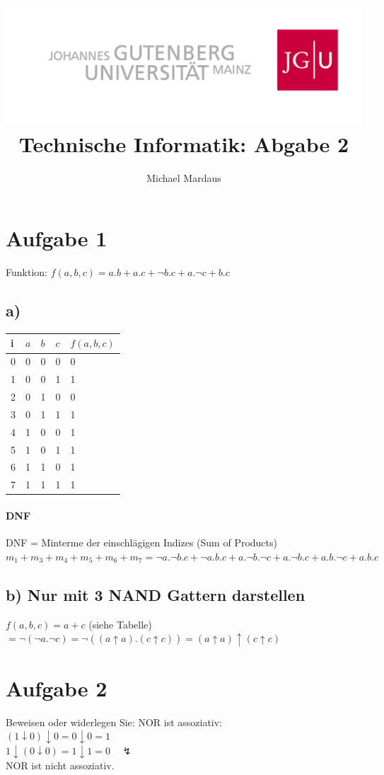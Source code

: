 \documentclass[10pt,a4paper]{scrartcl}
\author{Michael Mardaus}
\title{\includegraphics[scale=0.2]{../logo_schriftzug}\\ Technische Informatik:
Abgabe 2}
\begin{document}
\maketitle


\section{Aufgabe 1}
Funktion:
$f(a,b,c)=a.b + a.c + \neg b.c + a.\neg c + b.c$\\
\subsection{a)}
\begin{tabular}{|l||l|l|l||l|}\hline
i & $a$ & $b$ & $c$ & $f(a,b,c)$ \\\hline\hline
0 & 0 & 0 & 0 & 0 \\\hline
1 & 0 & 0 & 1 & 1 \\\hline
2 & 0 & 1 & 0 & 0 \\\hline
3 & 0 & 1 & 1 & 1 \\\hline
4 & 1 & 0 & 0 & 1 \\\hline
5 & 1 & 0 & 1 & 1 \\\hline
6 & 1 & 1 & 0 & 1 \\\hline
7 & 1 & 1 & 1 & 1 \\\hline
\end{tabular} 

\paragraph{DNF}
DNF = Minterme der einschlägigen Indizes (Sum of Products)\\
$m_1 + m_3 + m_4 + m_5 + m_6 + m_7 = \neg a.\neg b.c + \neg a.b.c + a.\neg b.\neg c + a.\neg b.c + a.b.\neg c + a.b.c$

\subsection{b) Nur mit 3 NAND Gattern darstellen}
$f(a,b,c) = a + c$ (siehe Tabelle)\\
$= \neg(\neg a.\neg c) = \neg((a\uparrow a).(c\uparrow c)) = (a\uparrow a) \uparrow (c\uparrow c)$

\section{Aufgabe 2}
Beweisen oder widerlegen Sie: NOR ist assoziativ:\\
$(1 \downarrow 0) \downarrow 0 = 0 \downarrow 0 = 1$\\
$1 \downarrow (0 \downarrow 0) = 1 \downarrow 1 = 0 \quad \lightning$\\
NOR ist nicht assoziativ.
\end{document}
